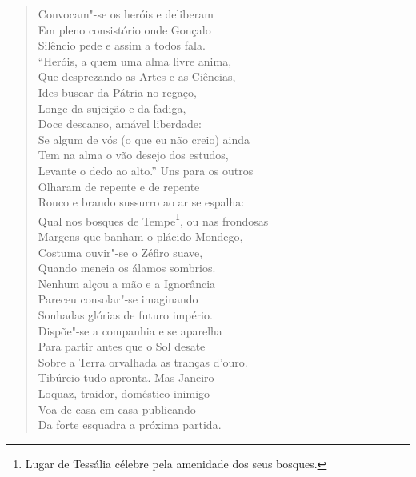 \begin{verse}
Convocam"-se os heróis e deliberam\\
Em pleno consistório onde Gonçalo\\
Silêncio pede e assim a todos fala.\\
``Heróis, a quem uma alma livre anima,\\
Que desprezando as Artes e as Ciências,\\
Ides buscar da Pátria no regaço,\\
Longe da sujeição e da fadiga,\\
Doce descanso, amável liberdade:\\
Se algum de vós (o que eu não creio) ainda\\
Tem na alma o vão desejo dos estudos,\\
Levante o dedo ao alto.'' Uns para os outros\\ 
Olharam de repente e de repente\\
Rouco e brando sussurro ao ar se espalha:\\
Qual nos bosques de Tempe\footnote{ Lugar de Tessália célebre pela
amenidade dos seus bosques.}, ou nas frondosas\\
Margens que banham o plácido Mondego,\\			\index{\Monde}
Costuma ouvir"-se o Zéfiro suave,\\		\index{\Zefir}
Quando meneia os álamos sombrios.\\
Nenhum alçou a mão e a Ignorância\\			\index{\Ignor}
Pareceu consolar"-se imaginando\\
Sonhadas glórias de futuro império. \\[10pt]


Dispõe"-se a companhia e se aparelha\\
Para partir antes que o Sol desate\\
Sobre a Terra orvalhada as tranças d'ouro.\\
Tibúrcio tudo apronta. Mas Janeiro\\ 		\index{\Jane}
Loquaz, traidor, doméstico inimigo\\
Voa de casa em casa publicando\\
Da forte esquadra a próxima partida. \\[10pt]



\end{verse}
